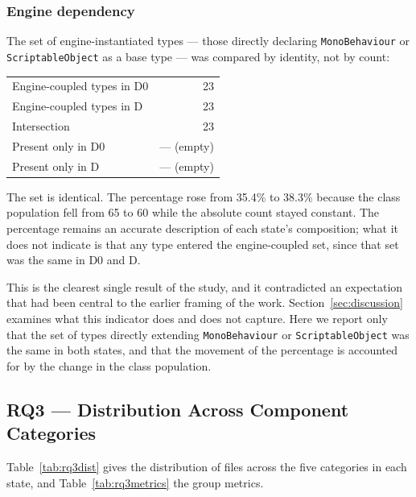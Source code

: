 \documentclass[pdflatex,sn-basic]{sn-jnl}
\begin{document}
\subsubsection{Engine dependency}

The set of engine-instantiated types --- those directly declaring \texttt{MonoBehaviour} or \texttt{ScriptableObject} as a base type --- was compared by identity, not by count:

\begin{center}\small
\begin{tabular}{lr}
Engine-coupled types in D0 & 23 \\
Engine-coupled types in D  & 23 \\
Intersection               & 23 \\
Present only in D0         & --- (empty) \\
Present only in D          & --- (empty) \\
\end{tabular}
\end{center}

The set is identical. The percentage rose from 35.4\% to 38.3\% because the class population fell from 65 to 60 while the absolute count stayed constant. The percentage remains an accurate description of each state's composition; what it does not indicate is that any type entered the engine-coupled set, since that set was the same in D0 and D.

This is the clearest single result of the study, and it contradicted an expectation that had been central to the earlier framing of the work. Section~\ref{sec:discussion} examines what this indicator does and does not capture. Here we report only that the set of types directly extending \texttt{MonoBehaviour} or \texttt{ScriptableObject} was the same in both states, and that the movement of the percentage is accounted for by the change in the class population.

\subsection{RQ3 --- Distribution Across Component Categories}\label{sec:rq3}

Table~\ref{tab:rq3dist} gives the distribution of files across the five categories in each state, and Table~\ref{tab:rq3metrics} the group metrics.
\end{document}
